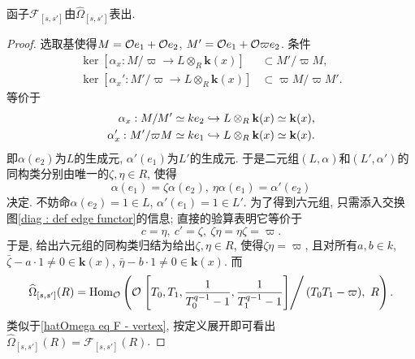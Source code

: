 \begin{proposition}\label{hatOmega eq F - edge}
    函子$\mathcal{F}_{[s, s']}$由$\hat{\Omega}_{[s, s']}$表出.
\end{proposition}
\begin{proof}
    选取基使得$M = \mathcal{O} e_1+\mathcal{O} e_2$, $M'=\mathcal{O} e_1+\mathcal{O}\varpi e_2$.
    条件\begin{align*}
        \ker[\alpha_x : M/\varpi\to L\otimes_R \mathbf{k}(x)]&\subset M'/\varpi M,\\
        \ker[\alpha_x' : M'/\varpi \to L\otimes_R \mathbf{k}(x)] &\subset \varpi M/\varpi M'.
    \end{align*}等价于\begin{align*}
        \alpha_x : M/M' \simeq ke_2&\hookrightarrow L\otimes_R \mathbf{k}(x)\simeq \mathbf{k}(x),\\
        \alpha'_x : M'/\varpi M\simeq ke_1 &\hookrightarrow L\otimes_R \mathbf{k}(x)\simeq \mathbf{k}(x).
    \end{align*}
    即$\alpha(e_2)$为$L$的生成元, $\alpha'(e_1)$为$L'$的生成元.
    于是二元组$(L, \alpha)$和$(L', \alpha')$的同构类分别由唯一的$\zeta, \eta\in R$,
    使得\[\alpha(e_1) = \zeta\alpha(e_2),\ \eta\alpha(e_1) = \alpha'(e_2)\]决定.
    不妨命$\alpha(e_2) = 1\in L$, $\alpha'(e_1) = 1\in L'$.
    为了得到六元组, 只需添入交换图\cref{diag : def edge functor}的信息; 直接的验算表明它等价于\[c = \eta,\ c' = \zeta,\ \zeta\eta = \eta\zeta = \varpi.\]
    于是, 给出六元组的同构类归结为给出$\zeta, \eta\in R$, 使得$\zeta\eta = \varpi$, 且对所有$a, b\in k$, $\bar{\zeta} - a\cdot 1\ne 0\in\mathbf{k}(x)$, $\bar{\eta} - b\cdot 1\ne 0\in\mathbf{k}(x)$.
    而\[\widehat{\Omega}_{[s, s']}(R) = \operatorname{Hom}_{\mathcal{O}}\left( \mathcal{O}\left.\left[ T_0, T_1, \frac{1}{T_0^{q-1}-1}, \frac{1}{T_1^{q-1}-1} \right]\right/(T_0T_1-\varpi) ,\ R\right).\]
    类似于\cref{hatOmega eq F - vertex}, 按定义展开即可看出$\hat{\Omega}_{[s, s']}(R) = \mathcal{F}_{[s, s']}(R)$.
\end{proof}

